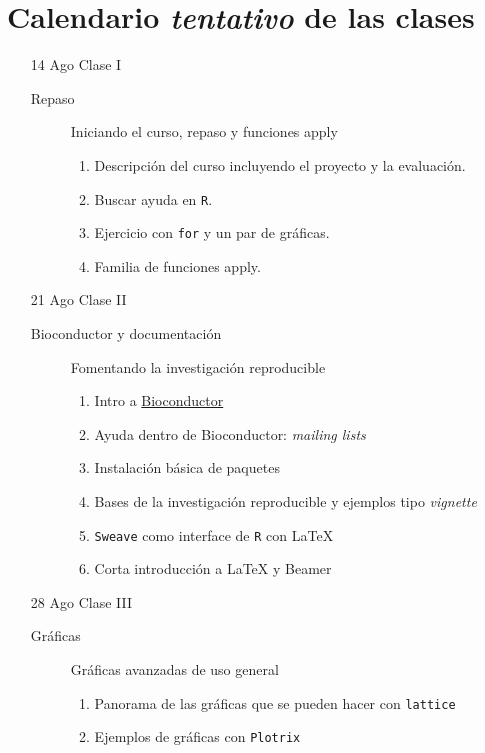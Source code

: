 \documentclass[letterpaper,12pt]{article}
\newcommand{\pl}[1]{\texttt{#1}}
\newcommand{\myurlshort}[2]{\href{http://#1}{{\textsf{#2}}}}
\begin{document}
\section{Calendario \emph{tentativo} de las clases}

\begin{itemize} 

\item[14 Ago] Clase I
  \begin{description}
  \item[Repaso] Iniciando el curso, repaso y funciones apply
  \begin{enumerate}
  \item Descripción del curso incluyendo el proyecto y la evaluación.
  \item Buscar ayuda en \pl{R}.
  \item Ejercicio con \pl{for} y un par de gráficas.
  \item Familia de funciones apply.
  \end{enumerate}
  \end{description}
  
  \item[21 Ago] Clase II
  \begin{description}
  \item[Bioconductor y documentación] Fomentando la investigación reproducible
  \begin{enumerate}
  \item Intro a \myurlshort{bioconductor.org}{Bioconductor}
  \item Ayuda dentro de Bioconductor: \emph{mailing lists}
  \item Instalación básica de paquetes
  \item Bases de la investigación reproducible y ejemplos tipo \emph{vignette}
  \item \pl{Sweave} como interface de \pl{R} con \LaTeX{}
  \item Corta introducción a \LaTeX{} y Beamer
  \end{enumerate}
  \end{description}
  
  \item[28 Ago] Clase III
  \begin{description}
  \item[Gráficas] Gráficas avanzadas de uso general
  \begin{enumerate}
  \item Panorama de las gráficas que se pueden hacer con \pl{lattice}
  \item Ejemplos de gráficas con \pl{Plotrix}
  \end{enumerate}
  \end{description}
  

\end{itemize}
\end{document}
